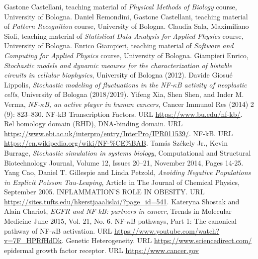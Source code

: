 \documentclass[12pt,a4paper]{report}
\begin{document}
\begin{thebibliography}{bibliography}
      Gastone Castellani, teaching material of {\em Physical Methods of Biology} course, University of Bologna.
     Daniel Remondini, Gastone Castellani, teaching material of {\em Pattern Recognition} course, University of Bologna.
     Claudia Sala, Maximiliano Sioli, teaching material of {\em Statistical Data Analysis for Applied Physics} course, University of Bologna.
     Enrico Giampieri, teaching material of {\em Software and Computing for Applied Physics} course, University of Bologna.
     Giampieri Enrico, {\em Stochastic models and dynamic meaures for the characterization of bistable circuits in cellular biophysics}, University of Bologna (2012).
     Davide Giosué Lippolis, {\em Stochastic modeling of fluctuations in the NF-$\kappa$B activity of neoplastic cells}, University of Bologna (2018/2019).
     Yifeng Xia, Shen Shen, and Inder M. Verma, {\em NF-$\kappa$B, an active player in human cancers}, Cancer Immunol Res (2014) 2 (9): 823–830.
     NF-kB Transcription Factors. URL \url{https://www.bu.edu/nf-kb/}.
     Rel homology domain (RHD), DNA-binding domain. URL \url{https://www.ebi.ac.uk/interpro/entry/InterPro/IPR011539/}.
	 NF-kB. URL \url{https://en.wikipedia.org/wiki/NF-%CE%BAB}.
     Tamás Székely Jr., Kevin Burrage, {\em Stochastic simulation in systems biology}, Computational and Structural Biotechnology Journal, Volume 12, Issues 20–21, November 2014, Pages 14-25.
     Yang Cao, Daniel T. Gillespie and Linda Petzold, {\em Avoiding Negative Populations in Explicit Poisson Tau-Leaping}, Article  in  The Journal of Chemical Physics, September 2005.
     INFLAMMATION'S ROLE IN OBESITY. URL \url{https://sites.tufts.edu/hkerstjaaalislai/?page_id=541}.
     Kateryna Shostak and Alain Chariot, {\em EGFR and NF-kB: partners in cancer}, Trends in Molecular Medicine June 2015, Vol. 21, No. 6.
     NF-$\kappa$B pathways, Part 1: The canonical pathway of NF-$\kappa$B activation. URL \url{https://www.youtube.com/watch?v=7F_HPRfHdDk}.
     Genetic Heterogeneity. URL \href{https://www.sciencedirect.com/topics/biochemistry-genetics-and-molecular-biology/genetic-heterogeneity}{https://www.sciencedirect.com/}
     epidermal growth factor receptor. URL \href{https://www.cancer.gov/publications/dictionaries/cancer-terms/def/epidermal-growth-factor-receptor}{https://www.cancer.gov}

\end{thebibliography}
\end{document}
